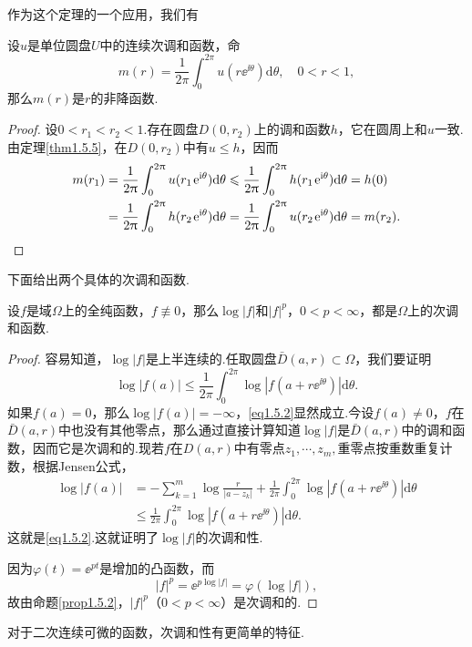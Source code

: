 作为这个定理的一个应用，我们有
\begin{theorem}\label{thm1.5.6}
	设$u$是单位圆盘$U$中的连续次调和函数，命
	\[m(r)=\frac1{2\pi}\int_{0}^{2\pi} u(r\ee^{\ii\theta})\mathrm{d}\theta,\quad 0<r<1,\]
	那么$m(r)$是$r$的非降函数.
\end{theorem}
\begin{proof}
	设$0<r_1<r_2<1$.存在圆盘$D(0,r_2)$上的调和函数$h$，它在圆周上和$u$一致.由定理\ref{thm1.5.5}，在$D(0,r_2)$中有$u\le h$，因而
	\begin{align*}
		m(r_1)
		&=\frac1{2\pi}\int_{0}^{2\pi} u(r_1\ee^{\ii\theta})\mathrm{d}\theta\le\frac1{2\pi}\int_{0}^{2\pi} h(r_1\ee^{\ii\theta})\mathrm{d}\theta=h(0)\\
		&=\frac1{2\pi}\int_{0}^{2\pi}h(r_2\ee^{\ii\theta})\mathrm{d}\theta=\frac1{2\pi}\int_{0}^{2\pi} u(r_2\ee^{\ii\theta})\mathrm{d}\theta=m(r_2).\qedhere
	\end{align*}
\end{proof}
下面给出两个具体的次调和函数.
\begin{prop}\label{prop1.5.7}
	设$f$是域$\Omega$上的全纯函数，$f\not\equiv0$，那么$\log|f|$和$|f|^p$，$0<p<\infty$，都是$\Omega$上的次调和函数.
\end{prop}
	\begin{proof}
		容易知道，$\log|f|$是上半连续的.任取圆盘$\bar{D}(a,r)\subset\Omega$，我们要证明
		\begin{equation}\label{eq1.5.2}
			\log|f(a)|\le\frac1{2\pi} \int_{0}^{2\pi} \log|f(a+r\ee^{\ii\theta})|\mathrm{d}\theta.
		\end{equation}
	如果$f(a)=0$，那么$\log|f(a)|=-\infty$，\eqref{eq1.5.2}显然成立.今设$f(a)\neq0$，$f$在$\bar{D}(a,r)$中也没有其他零点，那么通过直接计算知道$\log|f|$是$\bar{D}(a,r)$中的调和函数，因而它是次调和的.现若$f$在$D(a,r)$中有零点$z_1,\cdots,z_m,$重零点按重数重复计数，根据Jensen公式，
	\begin{align*}
		\log|f(a)|
		&=-\sum_{k=1}^{m}\log\frac{r}{|a-z_k|}+\frac1{2\pi}\int_{0}^{2\pi} \log|f(a+r\ee^{\ii \theta})|\mathrm{d}\theta\\
		&\le\frac1{2\pi}\int_{0}^{2\pi}\log|f(a+r\ee^{\ii\theta})|\mathrm{d}\theta.
		\end{align*}
	这就是\eqref{eq1.5.2}.这就证明了$\log|f|$的次调和性.
	
	因为$\varphi(t)=\ee^{pt}$是增加的凸函数，而
	\[|f|^p=\ee^{p\log|f|}=\varphi(\log|f|),\]
	故由命题\ref{prop1.5.2}，$|f|^p$（$0<p<\infty$）是次调和的.
	\end{proof}
对于二次连续可微的函数，次调和性有更简单的特征.
